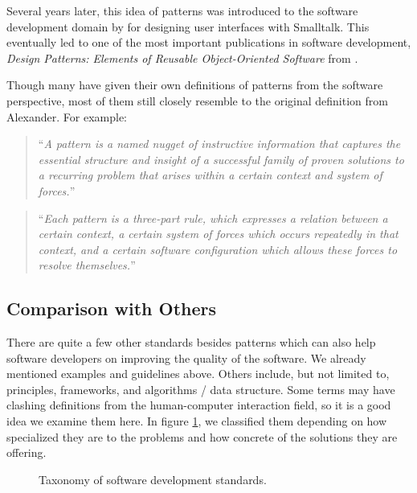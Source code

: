 \documentclass[a4paper,titlepage]{article}
\begin{document}
Several years later, this idea of patterns was introduced to the
software development domain by \citet{patterns:beck} for designing
user interfaces with Smalltalk. This eventually led to one of the most
important publications in software development, \textit{Design
  Patterns: Elements of Reusable Object-Oriented Software} from
\citet{patterns:gamma}.

Though many have given their own definitions of patterns from the
software perspective, most of them still closely resemble to the
original definition from Alexander. For example:
\begin{quote}
  ``{\it A pattern is a named nugget of instructive information that
    captures the essential structure and insight of a successful
    family of proven solutions to a recurring problem that arises
    within a certain context and system of forces.}''

  \raggedleft \citet{patterns:appleton}
\end{quote}

\begin{quote}
  ``{\it Each pattern is a three-part rule, which expresses a relation
    between a certain context, a certain system of forces which occurs
    repeatedly in that context, and a certain software configuration
    which allows these forces to resolve themselves.}''

  \raggedleft \citet{timeless:gabriel}
\end{quote}

\subsection{Comparison with Others}
There are quite a few other standards besides patterns which can also
help software developers on improving the quality of the software. We
already mentioned examples and guidelines above. Others include, but
not limited to, principles, frameworks, and algorithms / data
structure. Some terms may have clashing definitions from the
human-computer interaction field, so it is a good idea we examine them
here. In figure \ref{fig:standards}, we classified them depending on
how specialized they are to the problems and how concrete of the
solutions they are offering.

\begin{figure}[!t]
\centering

\caption{Taxonomy of software development standards.}
\label{fig:standards}
\end{figure}
\end{document}

